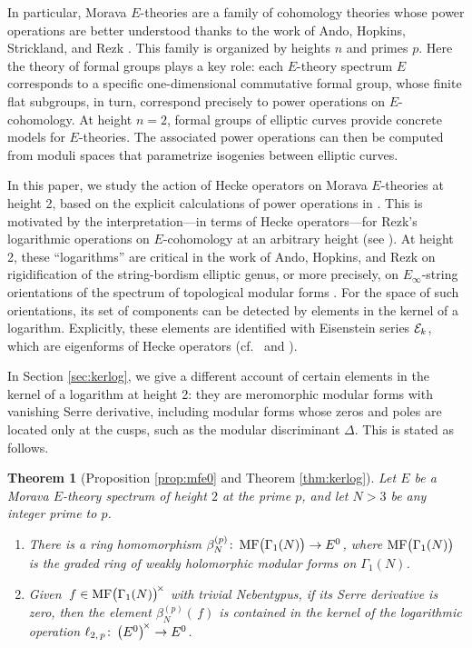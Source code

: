 \documentclass{gtpart}
\newtheorem{thm}[equation]{Theorem}
\theoremstyle{definition}
\theoremstyle{remark}
\def\co{\colon\thinspace}
\newcommand{\CE}{{\cal E}}
\newcommand{\MF}{{\rm MF}}
\newcommand{\B}{\beta}
\renewcommand{\D}{\Delta}
\newcommand{\G}{\Gamma}
\renewcommand{\=}{\approx}
\renewcommand{\-}{\sim}
\numberwithin{equation}{section}
\begin{document}
In particular, Morava $E$-theories are a family of cohomology theories whose 
power operations are better understood thanks to the work of Ando, Hopkins, 
Strickland, and Rezk \cite{AHS04,cong,iph}.  This family is organized by heights 
$n$ and primes $p$.  Here the theory of formal groups plays a key role: each 
$E$-theory spectrum $E$ corresponds to a specific one-dimensional commutative 
formal group, whose finite flat subgroups, in turn, correspond precisely to 
power operations on $E$-cohomology.  At height $n = 2$, formal groups of 
elliptic curves provide concrete models for $E$-theories.  The associated power 
operations can then be computed from moduli spaces that parametrize isogenies 
between elliptic curves.  

In this paper, we study the action of Hecke operators on Morava $E$-theories at 
height 2, based on the explicit calculations of power operations in 
\cite{h2p2,p3}.  This is motivated by the interpretation---in terms of Hecke 
operators---for Rezk's logarithmic operations on $E$-cohomology at an arbitrary 
height (see \cite[1.12]{log}).  At height 2, these ``logarithms'' are critical 
in the work of Ando, Hopkins, and Rezk on rigidification of the string-bordism 
elliptic genus, or more precisely, on $E_\infty$-string orientations of the 
spectrum of topological modular forms \cite{koandtmf}.  For the space of such 
orientations, its set of components can be detected by elements in the kernel of 
a logarithm.  Explicitly, these elements are identified with Eisenstein series 
$\CE_k$, which are eigenforms of Hecke operators \cite[Theorem 12.3]{koandtmf} 
(cf.~\cite[Theorem 40]{Sprang} and \cite[Theorem 0.4]{Wilson}).  

In Section \ref{sec:kerlog}, we give a different account of certain elements in 
the kernel of a logarithm at height 2: they are meromorphic modular forms with 
vanishing Serre derivative, including modular forms whose zeros and poles are 
located only at the cusps, such as the modular discriminant $\D$.  This is 
stated as follows.  

\begin{thm}[{Proposition \ref{prop:mfe0} and Theorem \ref{thm:kerlog}}]
 Let $E$ be a Morava $E$-theory spectrum of height $2$ at the prime $p$, and let 
 $N > 3$ be any integer prime to $p$.  
 \begin{enumerate}[{\em (i)}]
  \item There is a ring homomorphism 
  $\B_N^{(p)} \co \MF\big(\G_1(N)\big) \to E^0$, where $\MF\big(\G_1(N)\big)$ is 
  the graded ring of weakly holomorphic modular forms on $\G_1(N)$.  

  \item Given $\,f \in \MF\big(\G_1(N)\big)^{\!\times}$ with trivial Nebentypus, 
  if its Serre derivative is zero, then the element $\B_N^{(p)}(\,f)$ is 
  contained in the kernel of the logarithmic operation 
  $\ell_{2,\,p} \co \big(E^0\big)^{\!\times} \to E^0$.  
 \end{enumerate}
\end{thm}
\end{document}
